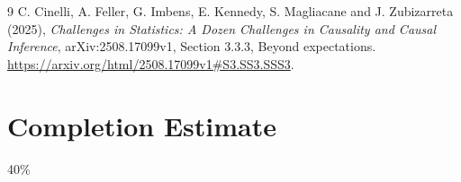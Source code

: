\documentclass[11pt]{article}
\theoremstyle{remark}
\begin{document}
\begin{thebibliography}{9}
 C. Cinelli, A. Feller, G. Imbens, E. Kennedy,
S. Magliacane and J. Zubizarreta (2025), \emph{Challenges in Statistics:
A Dozen Challenges in Causality and Causal Inference}, arXiv:2508.17099v1,
Section 3.3.3, Beyond expectations.
\url{https://arxiv.org/html/2508.17099v1#S3.SS3.SSS3}.
\end{thebibliography}

\section{Completion Estimate}
40\%
\end{document}
